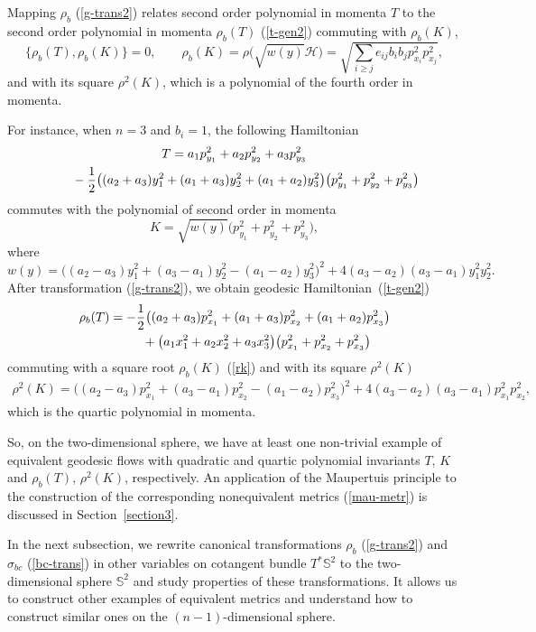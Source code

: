 \documentclass[pdftex]{sigma}
\numberwithin{equation}{section}
\begin{document}
Mapping $\rho_b$ (\ref{g-trans2}) relates second order polynomial in momenta $T$ to the second order polynomial in momenta $\rho_b(T)$ (\ref{t-gen2}) commuting with $\rho_b(K)$,
\begin{equation}\label{rk}
\{\rho_b(T),\rho_b(K)\}=0 ,\qquad \rho_b(K)=\rho\bigl(\sqrt{ w(y) } \mathcal H\bigr)=\sqrt{ \sum_{i\geq j} e_{ij}b_ib_j p^2_{x_i}p_{x_j}^2 },
\end{equation}
and with its square $\rho^2(K)$, which is a polynomial of the fourth order in momenta.

For instance, when $n=3$ and $b_i=1$, the following Hamiltonian
\begin{gather}
T=a_1p_{y_1}^2 + a_2p_{y_2}^2 + a_3p_{y_3}^2\nonumber\\
\hphantom{T=}{}-\frac{1}{2}\big((a_2+a_3)y_1^2+(a_1+a_3)y_2^2+(a_1+a_2)y_3^2 \big)\big(p_{y_1}^2+p_{y_2}^2+p_{y_3}^2\big)\label{t-trans}
\end{gather}
commutes with the polynomial of second order in momenta
\[
K=\sqrt{ w(y) } \big(p_{y_1}^2+p_{y_2}^2+p_{y_3}^2\big) ,
\]
where
\[
w(y)=\bigl((a_2 - a_3)y_1^2 + (a_3 - a_1)y_2^2-(a_1 - a_2)y_3^2\bigr)^2+4(a_3 - a_2)(a_3 - a_1)y_1^2y_2^2 .
\]
After transformation (\ref{g-trans2}), we obtain geodesic Hamiltonian~(\ref{t-gen2})
\begin{gather*}
\rho_b(T)= -\frac{1}{2}\bigl((a_2+a_3)p_{x_1}^2 + (a_1+a_3)p_{x_2}^2 + (a_1+a_2)p_{x_3}^2\bigr)\\
\hphantom{\rho_b(T)=}{}
 +\big(a_1x_1^2+a_2x_2^2+a_3x_3^2 \big)\big(p_{x_1}^2+p_{x_2}^2+p_{x_3}^2\big)
\end{gather*}
commuting with a square root $\rho_b(K)$ (\ref{rk}) and with its square $\rho^2(K)$
\begin{gather*}
 \rho^2(K)=\bigl((a_2 - a_3)p_{x_1}^2 + (a_3 - a_1)p_{x_2}^2-(a_1 - a_2)p_{x_3}^2\bigr)^2+4(a_3 - a_2)(a_3 - a_1)p_{x_1}^2p_{x_2}^2 ,
\end{gather*}
 which is the quartic polynomial in momenta.

 So, on the two-dimensional sphere, we have at least one non-trivial example of equivalent geodesic flows with quadratic and quartic polynomial invariants $T$, $K$ and $\rho_b(T)$, $\rho^2(K)$, respectively. An application of the Maupertuis principle to the construction of the corresponding nonequivalent metrics (\ref{mau-metr}) is discussed in Section~\ref{section3}.

In the next subsection, we rewrite canonical transformations $\rho_b$ (\ref{g-trans2}) and $\sigma_{bc}$ (\ref{bc-trans}) in other variables on cotangent bundle $T^*\mathbb S^2$ to the two-dimensional sphere $\mathbb S^2$ and study properties of these transformations. It allows us to construct other examples of equivalent metrics and understand how to construct similar ones on the $(n-1)$-dimensional sphere.
\end{document}
